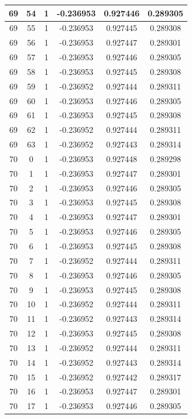 \documentclass[12pt,a4paper]{article}
\numberwithin{equation}{section}
\numberwithin{figure}{section}
\numberwithin{table}{section}
\begin{document}
\begin{longtable}{|c|c|c|c|c|c|}
69 & 54 & 1 & -0.236953 & 0.927446 & 0.289305 \\ \hline
69 & 55 & 1 & -0.236953 & 0.927445 & 0.289308 \\ \hline
69 & 56 & 1 & -0.236953 & 0.927447 & 0.289301 \\ \hline
69 & 57 & 1 & -0.236953 & 0.927446 & 0.289305 \\ \hline
69 & 58 & 1 & -0.236953 & 0.927445 & 0.289308 \\ \hline
69 & 59 & 1 & -0.236952 & 0.927444 & 0.289311 \\ \hline
69 & 60 & 1 & -0.236953 & 0.927446 & 0.289305 \\ \hline
69 & 61 & 1 & -0.236953 & 0.927445 & 0.289308 \\ \hline
69 & 62 & 1 & -0.236952 & 0.927444 & 0.289311 \\ \hline
69 & 63 & 1 & -0.236952 & 0.927443 & 0.289314 \\ \hline
70 & 0 & 1 & -0.236953 & 0.927448 & 0.289298 \\ \hline
70 & 1 & 1 & -0.236953 & 0.927447 & 0.289301 \\ \hline
70 & 2 & 1 & -0.236953 & 0.927446 & 0.289305 \\ \hline
70 & 3 & 1 & -0.236953 & 0.927445 & 0.289308 \\ \hline
70 & 4 & 1 & -0.236953 & 0.927447 & 0.289301 \\ \hline
70 & 5 & 1 & -0.236953 & 0.927446 & 0.289305 \\ \hline
70 & 6 & 1 & -0.236953 & 0.927445 & 0.289308 \\ \hline
70 & 7 & 1 & -0.236952 & 0.927444 & 0.289311 \\ \hline
70 & 8 & 1 & -0.236953 & 0.927446 & 0.289305 \\ \hline
70 & 9 & 1 & -0.236953 & 0.927445 & 0.289308 \\ \hline
70 & 10 & 1 & -0.236952 & 0.927444 & 0.289311 \\ \hline
70 & 11 & 1 & -0.236952 & 0.927443 & 0.289314 \\ \hline
70 & 12 & 1 & -0.236953 & 0.927445 & 0.289308 \\ \hline
70 & 13 & 1 & -0.236952 & 0.927444 & 0.289311 \\ \hline
70 & 14 & 1 & -0.236952 & 0.927443 & 0.289314 \\ \hline
70 & 15 & 1 & -0.236952 & 0.927442 & 0.289317 \\ \hline
70 & 16 & 1 & -0.236953 & 0.927447 & 0.289301 \\ \hline
70 & 17 & 1 & -0.236953 & 0.927446 & 0.289305 \\ \hline

\end{longtable}
\end{document}
